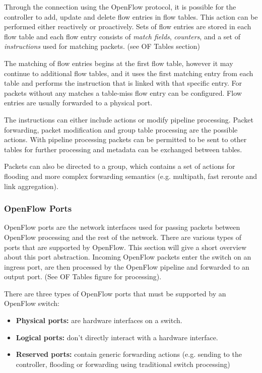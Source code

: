 Through the connection using the OpenFlow protocol, it is possible for the controller to add, update and delete flow entries in flow tables.  This action can be performed either reactively or proactively. Sets of flow entries are stored in each flow table and each flow entry consists of \textit{match fields}, \textit{counters}, and a set of \textit{instructions} used for matching packets. (see OF Tables section)

The matching of flow entries begins at the first flow table, however it may continue to additional flow tables, and it uses the first matching entry from each table and performs the instruction that is linked with that specific entry. For packets without any matches a table-miss flow entry can be configured. Flow entries are usually forwarded to a physical port.

The instructions can either include actions  or modify pipeline processing. Packet forwarding, packet modification and group table processing are the possible actions. With pipeline processing packets can be permitted to be sent to other tables for further processing and metadata can be exchanged between tables.

Packets can also be directed to a group, which contains a set of actions for flooding and more complex forwarding semantics (e.g. multipath, fast reroute and link aggregation).

\subsubsection{OpenFlow Ports}
OpenFlow ports are the network interfaces used for passing packets between OpenFlow processing and the rest of the network.
There are various types of ports that are supported by OpenFlow. This section will give a short overview about this port abstraction.
Incoming OpenFlow packets enter the switch on an ingress port, are then processed by the OpenFlow pipeline and forwarded to an output port. (See OF Tables figure for processing).

There are three types of OpenFlow ports that must be supported by an OpenFlow switch:
\begin{itemize}
\item \textbf{Physical ports:} are hardware interfaces on a switch.
\item \textbf{Logical ports:} don't directly interact  with a hardware interface.
\item \textbf{Reserved ports:} contain generic forwarding actions (e.g. sending to the controller, flooding or forwarding using traditional switch processing)
\end{itemize}

